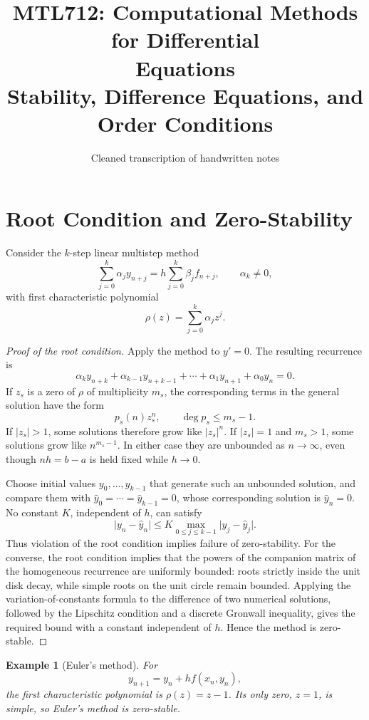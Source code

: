 \documentclass[11pt,a4paper]{article}
\title{\textcolor{blue!50!black}{\textbf{MTL712: Computational Methods for Differential\\Equations}}\\[6pt]
\large Stability, Difference Equations, and Order Conditions}
\author{\normalsize Cleaned transcription of handwritten notes}
\date{}
\numberwithin{equation}{section}
\theoremstyle{spacedplain}
\theoremstyle{spaceddefinition}
\newtheorem{example}[theorem]{Example}
\theoremstyle{spacedremark}
\begin{document}
\maketitle
\thispagestyle{plain}
\tableofcontents
\clearpage

\section{Root Condition and Zero-Stability}

Consider the \(k\)-step linear multistep method
\[
  \sum_{j=0}^{k}\alpha_j y_{n+j}
  =h\sum_{j=0}^{k}\beta_j f_{n+j},
  \qquad
  \alpha_k\neq 0,
\]
with first characteristic polynomial
\[
  \rho(z)=\sum_{j=0}^{k}\alpha_jz^j.
\]

\begin{proof}[Proof of the root condition]
Apply the method to \(y'=0\).  The
resulting recurrence is
\[
  \alpha_k y_{n+k}+\alpha_{k-1}y_{n+k-1}
  +\cdots+\alpha_1y_{n+1}+\alpha_0y_n=0.
\]
If \(z_s\) is a zero of \(\rho\) of multiplicity \(m_s\), the
corresponding terms in the general solution have the form
\[
  p_s(n)z_s^n,
  \qquad \deg p_s\leq m_s-1.
\]
If \(\lvert z_s\rvert>1\), some solutions therefore grow like
\(\lvert z_s\rvert^n\).  If \(\lvert z_s\rvert=1\) and \(m_s>1\), some
solutions grow like \(n^{m_s-1}\).  In either case they are unbounded as
\(n\to\infty\), even though \(nh=b-a\) is held fixed while \(h\to0\).

Choose initial values \(y_0,\ldots,y_{k-1}\) that generate such an
unbounded solution, and compare them with
\(\widehat y_0=\cdots=\widehat y_{k-1}=0\), whose corresponding solution
is \(\widehat y_n=0\).  No constant \(K\), independent of \(h\), can
satisfy
\[
  \lvert y_n-\widehat y_n\rvert
  \leq K\max_{0\leq j\leq k-1}
  \lvert y_j-\widehat y_j\rvert .
\]
Thus violation of the root condition implies failure of zero-stability.
For the converse, the root condition implies that the powers of the
companion matrix of the homogeneous recurrence are uniformly bounded:
roots strictly inside the unit disk decay, while simple roots on the
unit circle remain bounded.  Applying the variation-of-constants
formula to the difference of two numerical solutions, followed by the
Lipschitz condition and a discrete Gronwall inequality, gives the
required bound with a constant independent of \(h\).  Hence the method
is zero-stable.
\end{proof}

\begin{example}[Euler's method]
For
\[
  y_{n+1}=y_n+h f(x_n,y_n),
\]
the first characteristic polynomial is \(\rho(z)=z-1\).  Its only zero,
\(z=1\), is simple, so Euler's method is zero-stable.
\end{example}
\end{document}
